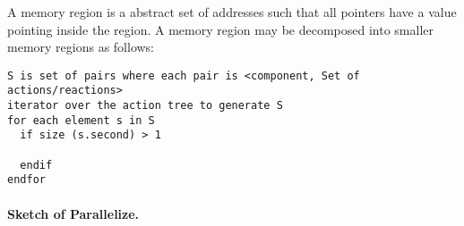A memory region is a abstract set of addresses such that all pointers have a value pointing inside the region.
A memory region may be decomposed into smaller memory regions as follows:

\begin{verbatim}
S is set of pairs where each pair is <component, Set of actions/reactions>
iterator over the action tree to generate S
for each element s in S
  if size (s.second) > 1

  endif
endfor
\end{verbatim}

\paragraph{Sketch of Parallelize.}
